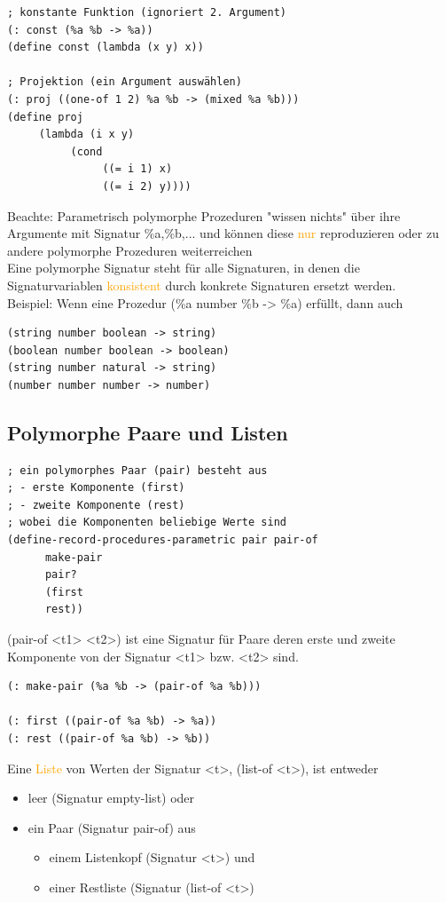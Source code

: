 \documentclass[paper=a4, fontsize=11pt]{scrartcl}
\numberwithin{equation}{section}
\numberwithin{figure}{section}
\numberwithin{table}{section}
\begin{document}
\begin{lstlistig}
\begin{lstlisting}
; konstante Funktion (ignoriert 2. Argument)
(: const (%a %b -> %a))
(define const (lambda (x y) x))

; Projektion (ein Argument auswählen)
(: proj ((one-of 1 2) %a %b -> (mixed %a %b)))
(define proj 
     (lambda (i x y) 
          (cond
               ((= i 1) x)
               ((= i 2) y))))
\end{lstlisting}

Beachte: Parametrisch polymorphe Prozeduren "wissen nichts" über ihre Argumente mit Signatur \%a,\%b,... und können diese \textcolor{orange}{nur} reproduzieren oder zu andere polymorphe Prozeduren weiterreichen \\
Eine polymorphe Signatur steht für alle Signaturen, in denen die Signaturvariablen \textcolor{orange}{konsistent} durch konkrete Signaturen ersetzt werden. \\
Beispiel: Wenn eine Prozedur (\%a number \%b -> \%a) erfüllt, dann auch
\begin{lstlisting}
(string number boolean -> string)
(boolean number boolean -> boolean)
(string number natural -> string)
(number number number -> number)
\end{lstlisting}
\subsection{Polymorphe Paare und Listen}
\begin{lstlisting}
; ein polymorphes Paar (pair) besteht aus
; - erste Komponente (first)
; - zweite Komponente (rest)
; wobei die Komponenten beliebige Werte sind
(define-record-procedures-parametric pair pair-of
      make-pair
      pair?
      (first
      rest))
\end{lstlisting}

(pair-of <t1> <t2>) ist eine Signatur für Paare deren erste und zweite Komponente von der Signatur <t1> bzw. <t2> sind.

\begin{lstlisting}
(: make-pair (%a %b -> (pair-of %a %b)))

(: first ((pair-of %a %b) -> %a))
(: rest ((pair-of %a %b) -> %b))
\end{lstlisting}

Eine \textcolor{orange}{Liste} von Werten der Signatur <t>, (list-of <t>), ist entweder \\
\begin{itemize}
\item leer (Signatur empty-list) oder
\item ein Paar (Signatur pair-of) aus
        \begin{itemize}
        \item einem Listenkopf (Signatur <t>) und
        \item einer Restliste (Signatur (list-of <t>)
        \end{itemize}
\end{itemize}


\end{lstlistig}
\end{document}

